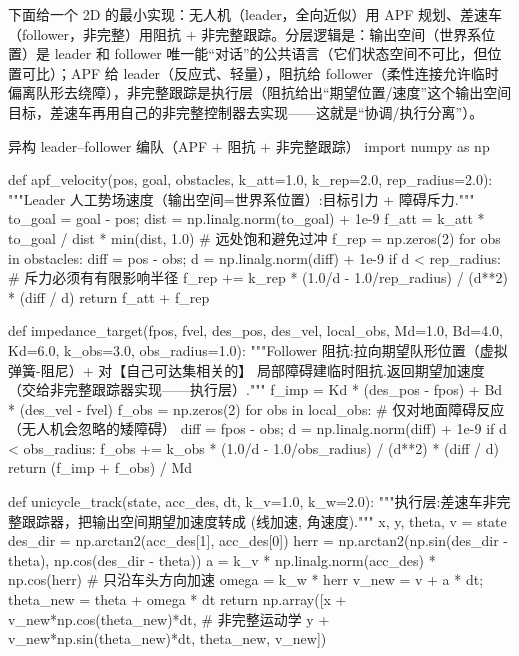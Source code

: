 \noindent 下面给一个 2D 的最小实现：无人机（leader，全向近似）用 APF 规划、差速车（follower，非完整）用阻抗 $+$ 非完整跟踪。分层逻辑是：输出空间（世界系位置）是 leader 和 follower 唯一能“对话”的公共语言（它们状态空间不可比，但位置可比）；APF 给 leader（反应式、轻量），阻抗给 follower（柔性连接允许临时偏离队形去绕障），非完整跟踪是执行层（阻抗给出“期望位置/速度”这个输出空间目标，差速车再用自己的非完整控制器去实现——这就是“协调/执行分离”）。

\begin{codebox}[Python]{异构 leader--follower 编队（APF $+$ 阻抗 $+$ 非完整跟踪）}
import numpy as np

def apf_velocity(pos, goal, obstacles, k_att=1.0, k_rep=2.0, rep_radius=2.0):
    """Leader 人工势场速度（输出空间=世界系位置）:目标引力 + 障碍斥力."""
    to_goal = goal - pos; dist = np.linalg.norm(to_goal) + 1e-9
    f_att = k_att * to_goal / dist * min(dist, 1.0)       # 远处饱和避免过冲
    f_rep = np.zeros(2)
    for obs in obstacles:
        diff = pos - obs; d = np.linalg.norm(diff) + 1e-9
        if d < rep_radius:                                # 斥力必须有有限影响半径
            f_rep += k_rep * (1.0/d - 1.0/rep_radius) / (d**2) * (diff / d)
    return f_att + f_rep

def impedance_target(fpos, fvel, des_pos, des_vel, local_obs,
                     Md=1.0, Bd=4.0, Kd=6.0, k_obs=3.0, obs_radius=1.0):
    """Follower 阻抗:拉向期望队形位置（虚拟弹簧-阻尼）+ 对【自己可达集相关的】
       局部障碍建临时阻抗.返回期望加速度（交给非完整跟踪器实现——执行层）."""
    f_imp = Kd * (des_pos - fpos) + Bd * (des_vel - fvel)
    f_obs = np.zeros(2)
    for obs in local_obs:                                 # 仅对地面障碍反应（无人机会忽略的矮障碍）
        diff = fpos - obs; d = np.linalg.norm(diff) + 1e-9
        if d < obs_radius:
            f_obs += k_obs * (1.0/d - 1.0/obs_radius) / (d**2) * (diff / d)
    return (f_imp + f_obs) / Md

def unicycle_track(state, acc_des, dt, k_v=1.0, k_w=2.0):
    """执行层:差速车非完整跟踪器，把输出空间期望加速度转成 (线加速, 角速度)."""
    x, y, theta, v = state
    des_dir = np.arctan2(acc_des[1], acc_des[0])
    herr = np.arctan2(np.sin(des_dir - theta), np.cos(des_dir - theta))
    a = k_v * np.linalg.norm(acc_des) * np.cos(herr)      # 只沿车头方向加速
    omega = k_w * herr
    v_new = v + a * dt; theta_new = theta + omega * dt
    return np.array([x + v_new*np.cos(theta_new)*dt,      # 非完整运动学
                     y + v_new*np.sin(theta_new)*dt, theta_new, v_new])
\end{codebox}

